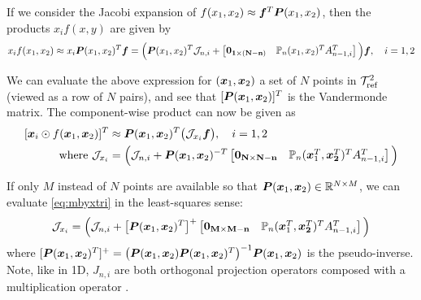 If we consider the Jacobi expansion of $f(x_1,x_2) \approx \boldsymbol{f}^T\boldsymbol{P}(x_1,x_2)$, then the products $x_if(x,y)$ are given by 
\begin{equation}\label{eq:multbyxi}
	x_if(x_1,x_2) \approx x_i\boldsymbol{P}(x_1,x_2)^T\boldsymbol{f} = \Big(\boldsymbol{P}(x_1,x_2)^T \mathcal{J}_{n,i}+ \begin{bmatrix} \bf{0}_{1\times (N-n)} & \mathbb{P}_n(x_1,x_2)^TA_{n-1,i}^T\end{bmatrix}\Big)\boldsymbol{f},\quad i=1,2
\end{equation}

We can evaluate the above expression for $(\boldsymbol{x}_1,\boldsymbol{x}_2)$ a set of $N$ points in $\mathcal{T}_{\text{ref}}^2$ (viewed as a row of $N$ pairs), and see that $[\boldsymbol{P}(\boldsymbol{x}_1,\boldsymbol{x}_2)]^T$ is the Vandermonde matrix. The component-wise product can now be given as
\begin{equation}\label{eq:mbyxtri}
	\begin{split}
	[\boldsymbol{x}_i\odot f(\boldsymbol{x}_1,\boldsymbol{x}_2)]^T &\approx \boldsymbol{P}(\boldsymbol{x}_1,\boldsymbol{x}_2)^T\big(\mathcal{J}_{x_i} \boldsymbol{f}\big), \quad i = 1,2\\
	\text{ where } \mathcal{J}_{x_i} &= \Big(\mathcal{J}_{n,i} +  \boldsymbol{P}(\boldsymbol{x}_1,\boldsymbol{x}_2)^{-T}\begin{bmatrix} \bf{0}_{N\times N-n} & \mathbb{P}_n(\boldsymbol{x}_1^T,\boldsymbol{x_2}^T)^TA_{n-1,i}^T\end{bmatrix}\Big)
	\end{split}
\end{equation}

If only $M$ instead of $N$ points are  available so that $\boldsymbol{P}(\boldsymbol{x}_1,\boldsymbol{x}_2) \in \mathbb{R}^{N \times M}$, we can evaluate \eqref{eq:mbyxtri} in the least-squares sense:
\begin{equation}\label{eq:lsqmbyxtri}
\mathcal{J}_{x_i} = \Big(\mathcal{J}_{n,i} +  \big[\boldsymbol{P}(\boldsymbol{x}_1,\boldsymbol{x}_2)^T\big]^{+}\begin{bmatrix} \bf{0}_{M\times M-n} & \mathbb{P}_n(\boldsymbol{x}_1^T,\boldsymbol{x_2}^T)^TA_{n-1,i}^T\end{bmatrix}\Big)
\end{equation}
where $[\boldsymbol{P}(\boldsymbol{x}_1,\boldsymbol{x}_2)^T]^{+} = \big(\boldsymbol{P}(\boldsymbol{x}_1,\boldsymbol{x}_2)\boldsymbol{P}(\boldsymbol{x}_1,\boldsymbol{x}_2)^{T}\big)^{-1}\boldsymbol{P}(\boldsymbol{x}_1,\boldsymbol{x}_2)$ is the pseudo-inverse. Note, like in 1D, \color{red} $J_{n,i}$ are both  orthogonal projection operators composed with a multiplication operator \color{black}. 

